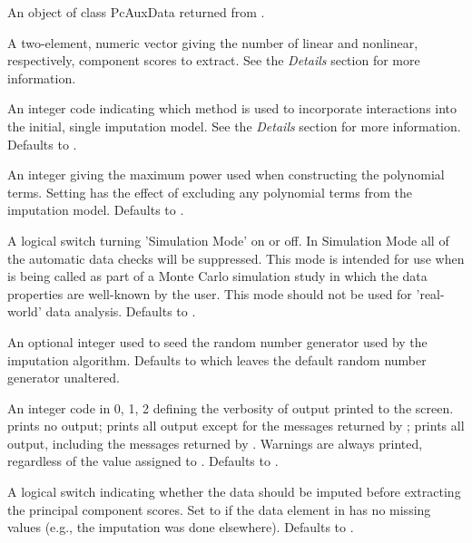\documentclass[letterpaper]{book}
\begin{document}
\begin{Arguments}
\begin{ldescription}
\item[\code{pcAuxData}] 
An object of class PcAuxData returned from . 

\item[\code{nComps}] 
A two-element, numeric vector giving the number of linear and
nonlinear, respectively, component scores to extract. See the
\emph{Details} section for more information.

\item[\code{interactType}] 
An integer code indicating which method is used to incorporate
interactions into the initial, single imputation model. See the
\emph{Details} section for more information. Defaults to
.

\item[\code{maxPolyPow}] 
An integer giving the maximum power used when constructing the
polynomial terms. Setting  has the effect of
excluding any polynomial terms from the imputation model. Defaults
to . 

\item[\code{simMode}] 
A logical switch turning 'Simulation Mode' on or off. In Simulation
Mode all of the automatic data checks will be suppressed. This mode
is intended for use when  is being called as part of a
Monte Carlo simulation study in which the data properties are
well-known by the user. This mode should not be used for
'real-world' data analysis. Defaults to .

\item[\code{seed}] 
An optional integer used to seed the random number generator used by the
imputation algorithm. Defaults to  which leaves
the default random number generator unaltered.

\item[\code{verbose}] 
An integer code in 0, 1, 2 defining the verbosity of output printed to the
screen.  prints no output; 
prints all output except for the messages returned by ;
 prints all output, including the messages
returned by . Warnings are always printed, regardless of the value
assigned to . Defaults to .

\item[\code{doImputation}] 
A logical switch indicating whether the data should be imputed
before extracting the principal component scores. Set to
 if the data element in  has no missing
values (e.g., the imputation was done elsewhere). Defaults to
.


\end{ldescription}
\end{Arguments}
\end{document}
